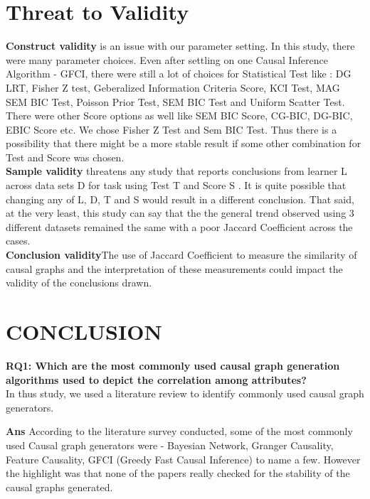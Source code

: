 \documentclass[sigconf,review,anonymous,nonacm=true]{acmart}
\begin{document}
\section{Threat to Validity}
\textbf{Construct validity} is an issue with our parameter setting. In
this study, there were many parameter choices. Even after settling on one Causal Inference Algorithm - GFCI, there were still a lot of choices for Statistical Test like : DG LRT, Fisher Z test, Geberalized Information Criteria Score, KCI Test, MAG SEM BIC Test, Poisson Prior Test, SEM BIC Test and Uniform Scatter Test. There were other Score options as well like SEM BIC Score, CG-BIC, DG-BIC, EBIC Score etc. We chose Fisher Z Test and Sem BIC Test. Thus there is a possibility that there might be a more stable result if some other combination for Test and Score was chosen.\\
\textbf{Sample validity} threatens any study that reports conclusions from
learner L across data sets D for task using Test T and Score S . It
is quite possible that changing any of L, D, T and S would result in a
different conclusion. That said, at the very least, this study can say
that the the general trend observed using 3 different datasets remained the same with a poor Jaccard Coefficient across the cases.\\
\textbf{Conclusion validity}The use of Jaccard Coefficient to measure the similarity of causal graphs and the interpretation of these measurements could impact the validity of the conclusions drawn.

\section{CONCLUSION}
\textbf{RQ1: Which are the most commonly used causal graph generation algorithms used to depict the correlation among attributes?}\\

In thus study, we used a literature review to identify
commonly used causal graph generators. 

\vspace{2mm}
 \begin{mdframed}[backgroundcolor=gray!15,linewidth=3px,%
    rightline=false,%
    topline=false,%
    bottomline=false,] 
    \textbf{Ans}
According to the literature survey conducted, some of the most commonly used Causal graph generators were - Bayesian Network, Granger Causality, Feature Causality, GFCI (Greedy Fast Causal Inference) to name a few. However the highlight was that none of the papers really checked for the stability of the causal graphs generated.
\end{mdframed}
\vspace{2mm}
\end{document}
